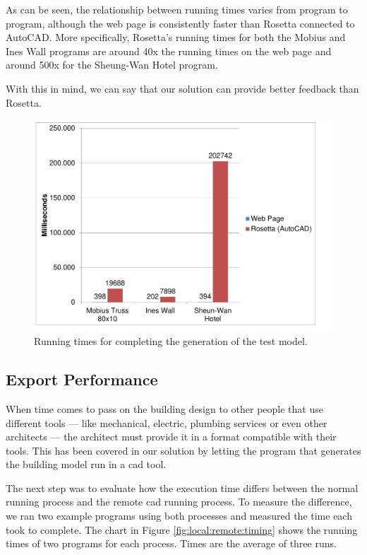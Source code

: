As can be seen, the relationship between running times varies from program to program, although the web page is consistently faster than Rosetta connected to AutoCAD.
More specifically, Rosetta's running times for both the Mobius and Ines Wall programs are around 40x the running times on the web page and around 500x for the Sheung-Wan Hotel program.

With this in mind, we can say that our solution can provide better feedback than Rosetta.


\begin{figure}
  \centering
  \includegraphics[width=12cm]{./images/run_timing_chart}
  \caption{Running times for completing the generation of the test model.}
  \label{fig:run:timing:chart}
\end{figure}


\subsection{Export Performance}
When time comes to pass on the building design to other people that use different tools --- like mechanical, electric, plumbing services or even other architects --- the architect must provide it in a format compatible with their tools.
This has been covered in our solution by letting the program that generates the building model run in a \gls{cad} tool.

The next step was to evaluate how the execution time differs between the normal running process and the remote \gls{cad} running process.
To measure the difference, we ran two example programs using both processes and measured the time each took to complete.
The chart in Figure \ref{fig:local:remote:timing} shows the running times of two programs for each process.
Times are the average of three runs.


